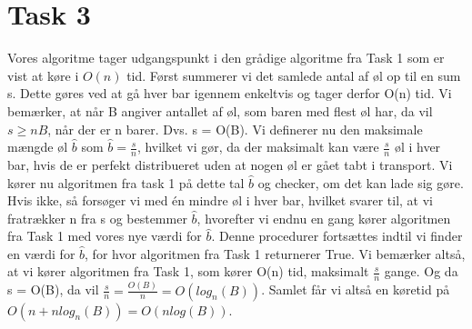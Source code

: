\section{Task 3}
Vores algoritme tager udgangspunkt i den grådige algoritme fra Task 1 som er vist at køre i $O(n)$ tid.
Først summerer vi det samlede antal af øl op til en sum s. Dette gøres ved at gå hver bar igennem enkeltvis og tager derfor O(n) tid.
Vi bemærker, at når B angiver antallet af øl, som baren med flest øl har, da vil $s \geq nB$, når der er n barer.
Dvs. s = O(B).
Vi definerer nu den maksimale mængde øl $\hat{b}$ som $\hat{b} = \frac{s}{n}$, hvilket vi gør, da der maksimalt kan være $\frac{s}{n}$ øl i hver bar, hvis de er perfekt distribueret uden at nogen øl er gået tabt i transport. Vi kører nu algoritmen fra task 1 på dette tal $\hat{b}$ og checker, om det kan lade sig gøre. Hvis ikke, så forsøger vi med én mindre øl i hver bar, hvilket svarer til, at vi fratrækker n fra s og bestemmer $\hat{b}$, hvorefter vi endnu en gang kører algoritmen fra Task 1 med vores nye værdi for $\hat{b}$. Denne procedurer fortsættes indtil vi finder en værdi for $\hat{b}$, for hvor algoritmen fra Task 1 returnerer True.
Vi bemærker altså, at vi kører algoritmen fra Task 1, som kører O(n) tid, maksimalt $\frac{s}{n}$ gange. Og da s = O(B), da vil $\frac{s}{n} = \frac{O(B)}{n} = O(log_n(B))$.
Samlet får vi altså en køretid på $O(n + nlog_n(B)) = O(nlog(B))$.
